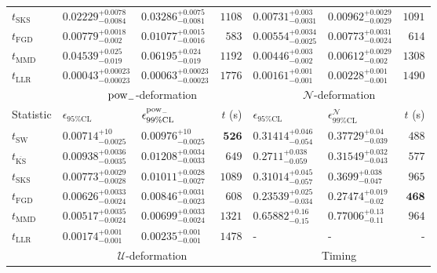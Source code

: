 \begin{tabular}{l|llr|llr}
	$t_{\mathrm{SKS}}$ & $0.02229_{-0.0084}^{+0.0078}$ & $0.03286_{-0.0081}^{+0.0075}$ & $1108$ & $0.00731_{-0.0031}^{+0.003}$ & $0.00962_{-0.0029}^{+0.0029}$ & $1091$ \\
	$t_{\mathrm{FGD}}$ & ${\mathbf{0.00779_{-0.002}^{+0.0018}}}$ & ${\mathbf{0.01077_{-0.0016}^{+0.0015}}}$ & $583$ & $0.00554_{-0.0025}^{+0.0034}$ & $0.00773_{-0.0024}^{+0.0031}$ & $614$ \\
	$t_{\mathrm{MMD}}$ & $0.04539_{-0.019}^{+0.025}$ & $0.06195_{-0.019}^{+0.024}$ & $1192$ & ${\mathbf{0.00446_{-0.002}^{+0.003}}}$ & ${\mathbf{0.00612_{-0.002}^{+0.0029}}}$ & $1308$ \\
	$t_{\mathrm{LLR}}$ & $0.00043_{-0.00023}^{+0.00023}$ & $0.00063_{-0.00023}^{+0.00023}$ & $1776$ & $0.00161_{-0.001}^{+0.001}$ & $0.00228_{-0.001}^{+0.001}$ & $1490$ \\
	\toprule
	\multicolumn{1}{c}{} & \multicolumn{3}{c}{$\rm{pow}_{-}$-deformation} & \multicolumn{3}{c}{$\mathcal{N}$-deformation} \\
	Statistic & $\epsilon_{95\%\mathrm{CL}}$ & $\epsilon^  {\rm{pow}_{-}}_{99\%\mathrm{CL}}$ & $t$ (s) & $\epsilon_{95\%\mathrm{CL}}$ & $\epsilon^    {\mathcal{N}}_{99\%\mathrm{CL}}$ & $t$ (s) \\
	\midrule
	$t_{\mathrm{SW}}$ & $0.00714_{-0.0025}^{+10}$ & $0.00976_{-0.0025}^{+10}$ & ${\mathbf{526}}$ & $0.31414_{-0.054}^{+0.046}$ & $0.37729_{-0.039}^{+0.04}$ & $488$ \\
	$t_{\overline{\mathrm{KS}}}$ & $0.00938_{-0.0035}^{+0.0036}$ & $0.01208_{-0.0033}^{+0.0034}$ & $649$ & $0.2711_{-0.059}^{+0.038}$ & $0.31549_{-0.043}^{+0.032}$ & $577$ \\
	$t_{\mathrm{SKS}}$ & $0.00773_{-0.0028}^{+0.0029}$ & $0.01011_{-0.0027}^{+0.0028}$ & $1089$ & $0.31014_{-0.057}^{+0.045}$ & $0.3699_{-0.047}^{+0.038}$ & $965$ \\
	$t_{\mathrm{FGD}}$ & $0.00626_{-0.0024}^{+0.0033}$ & $0.00846_{-0.0023}^{+0.0031}$ & $608$ & ${\mathbf{0.23539_{-0.034}^{+0.025}}}$ & ${\mathbf{0.27474_{-0.02}^{+0.019}}}$ & ${\mathbf{468}}$ \\
	$t_{\mathrm{MMD}}$ & ${\mathbf{0.00517_{-0.0024}^{+0.0035}}}$ & ${\mathbf{0.00699_{-0.0024}^{+0.0033}}}$ & $1321$ & $0.65882_{-0.15}^{+0.16}$ & $0.77006_{-0.11}^{+0.13}$ & $964$ \\
	$t_{\mathrm{LLR}}$ & $0.00174_{-0.001}^{+0.001}$ & $0.00235_{-0.001}^{+0.001}$ & $1478$ & - & - & - \\
	\toprule
	\multicolumn{1}{c}{} & \multicolumn{3}{c}{$\mathcal{U}$-deformation} & \multicolumn{3}{c}{Timing} \\

\end{tabular}
